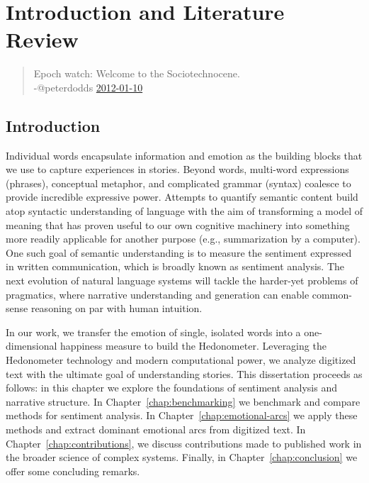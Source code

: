 \chapter{Introduction and Literature Review}

\begin{quote}
  Epoch watch: Welcome to the Sociotechnocene.\\
  -@peterdodds \href{https://twitter.com/peterdodds/status/156899358573465601}{2012-01-10}
\end{quote}

\section{Introduction}

Individual words encapsulate information and emotion as the building blocks that we use to capture experiences in stories.
Beyond words, multi-word expressions (phrases), conceptual metaphor, and complicated grammar (syntax) coalesce to provide incredible expressive power.
Attempts to quantify semantic content build atop syntactic understanding of language with the aim of transforming a model of meaning that has proven useful to our own cognitive machinery into something more readily applicable for another purpose (e.g., summarization by a computer).
One such goal of semantic understanding is to measure the sentiment expressed in written communication, which is broadly known as sentiment analysis.
The next evolution of natural language systems will tackle the harder-yet problems of pragmatics, where narrative understanding and generation can enable common-sense reasoning on par with human intuition.

In our work, we transfer the emotion of single, isolated words into a one-dimensional happiness measure to build the Hedonometer.
Leveraging the Hedonometer technology and modern computational power, we analyze digitized text with the ultimate goal of understanding stories.
This dissertation proceeds as follows: in this chapter we explore the foundations of sentiment analysis and narrative structure.
In Chapter~\ref{chap:benchmarking} we benchmark and compare methods for sentiment analysis.
In Chapter~\ref{chap:emotional-arcs} we apply these methods and extract dominant emotional arcs from digitized text.
In Chapter~\ref{chap:contributions}, we discuss contributions made to published work in the broader science of complex systems.
Finally, in Chapter~\ref{chap:conclusion} we offer some concluding remarks.

